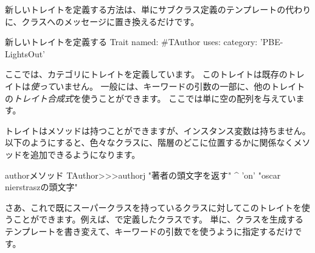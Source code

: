 \documentclass[a4paper,10pt,twoside]{book}
\begin{document}
新しいトレイトを定義する方法は、単にサブクラス定義のテンプレートの代わりに、クラスへのメッセージに置き換えるだけです。

\begin{classdef}[tauthor]{新しいトレイトを定義する}
Trait named: #TAuthor
	uses: { }
	category: 'PBE-LightsOut'
\end{classdef}

\noindent
ここでは、カテゴリにトレイトを定義しています。
このトレイトは既存のトレイトは\emph{使って}いません。
一般には、キーワードの引数の一部に、他のトレイトの\emph{トレイト合成式}を使うことができます。
ここでは単に空の配列を与えています。

トレイトはメソッドは持つことができますが、インスタンス変数は持ちません。
以下のようにすると、色々なクラスに、階層のどこに位置するかに関係なくメソッドを追加できるようになります。

\begin{method}[author]{authorメソッド}
TAuthor>>>authorj
    "著者の頭文字を返す"
	^ 'on'    "oscar nierstraszの頭文字"
\end{method}

\noindent
さあ、これで既にスーパークラスを持っているクラスに対してこのトレイトを使うことができます。例えば、で定義したクラスです。
単に、クラスを生成するテンプレートを書き変えて、キーワードの引数でを使うように指定するだけです。
\end{document}
